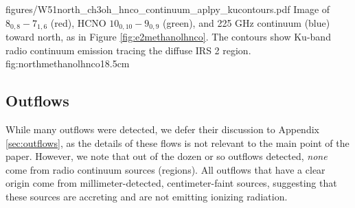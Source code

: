\documentclass{emulateapj}
\begin{document}
\Figure
{figures/W51north_ch3oh_hnco_continuum_aplpy_kucontours.pdf}
{Image of \methanol $8_{0,8}-7_{1,6}$ (red), HCNO $10_{0,10}-9_{0,9}$ (green),
and 225 GHz continuum (blue) toward  north, as in Figure
\ref{fig:e2methanolhnco}.  The contours show Ku-band radio continuum emission
tracing the diffuse IRS 2 \hii region.}
{fig:northmethanolhnco}{1}{8.5cm}

\subsection{Outflows}
\label{sec:mainoutflows}
While many outflows were detected, we defer their discussion to Appendix
\ref{sec:outflows}, as the details of these flows is not relevant to the main
point of the paper.  However, we note that out of the dozen or so outflows
detected, \emph{none} come from radio continuum sources (\hii regions).  All
outflows that have a clear origin come from millimeter-detected,
centimeter-faint sources, suggesting that these sources are accreting and are
not emitting ionizing radiation.








\end{document}
